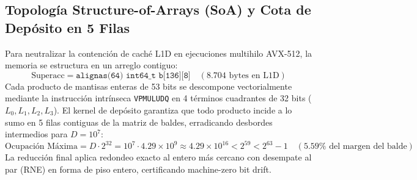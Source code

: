 \subsection{Topología Structure-of-Arrays (SoA) y Cota de Depósito en 5 Filas}
Para neutralizar la contención de caché L1D en ejecuciones multihilo AVX-512, la memoria se estructura en un arreglo contiguo:
\begin{equation}
\text{Superacc} = \texttt{alignas(64) int64\_t b[136][8]} \quad (8.704\text{ bytes en L1D})
\end{equation}
Cada producto de mantisas enteras de 53 bits se descompone vectorialmente mediante la instrucción intrínseca \texttt{VPMULUDQ} en 4 términos cuadrantes de 32 bits ($L_0, L_1, L_2, L_3$). El kernel de depósito garantiza que todo producto incide a lo sumo en 5 filas contiguas de la matriz de baldes, erradicando desbordes intermedios para $D = 10^7$:
\begin{equation}
\text{Ocupación Máxima} = D \cdot 2^{32} = 10^7 \cdot 4.29 \times 10^9 \approx 4.29 \times 10^{16} < 2^{59} < 2^{63}-1 \quad (5.59\% \text{ del margen del balde})
\end{equation}
La reducción final aplica redondeo exacto al entero más cercano con desempate al par (RNE) en forma de piso entero, certificando machine-zero bit drift.


